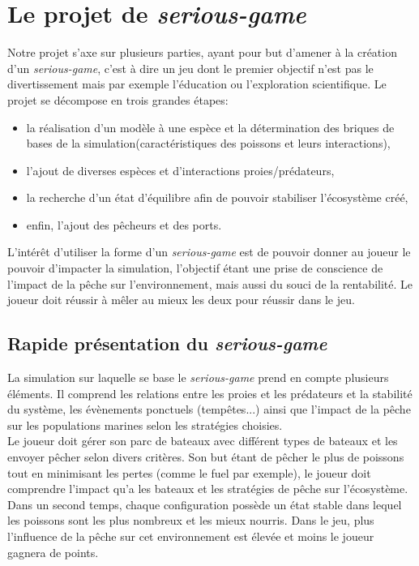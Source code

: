 \chapter{Le projet de \textit{serious-game}}
Notre projet s'axe sur plusieurs parties, ayant pour but d'amener à la création d'un \textit{serious-game}, c'est à dire un jeu dont le premier objectif n'est pas le divertissement mais par exemple l'éducation ou l'exploration scientifique. Le projet se décompose en trois grandes étapes:
\begin{itemize}
\item{la réalisation d'un modèle à une espèce et la détermination des briques de bases de la simulation(caractéristiques des poissons et leurs interactions),}
\item{l'ajout de diverses espèces et d'interactions proies/prédateurs,}
\item{la recherche d'un état d'équilibre afin de pouvoir stabiliser l'écosystème créé,}
\item{enfin, l'ajout des pêcheurs et des ports.}
\end{itemize}

L'intérêt d'utiliser la forme d'un \textit{serious-game} est de pouvoir donner au joueur le pouvoir d'impacter la simulation, l'objectif étant une prise de conscience de l'impact de la pêche sur l'environnement, mais aussi du souci de la rentabilité. Le joueur doit réussir à mêler au mieux les deux pour réussir dans le jeu.

\section{Rapide présentation du \textit{serious-game}}

La simulation sur laquelle se base le \textit{serious-game} prend en compte plusieurs éléments. Il comprend les relations entre les proies et les prédateurs et la stabilité du système, les évènements ponctuels (tempêtes...) ainsi que l'impact de la pêche sur les populations marines selon les stratégies choisies.
\\
Le joueur doit gérer son parc de bateaux avec différent types de bateaux et les envoyer pêcher selon divers critères. Son but étant de pêcher le plus de poissons tout en minimisant les pertes (comme le fuel par exemple), le joueur doit comprendre l'impact qu'a les bateaux et les stratégies de pêche sur l'écosystème.
\\
Dans un second temps, chaque configuration possède un état stable dans lequel les poissons sont les plus nombreux et les mieux nourris. Dans le jeu, plus l'influence de la pêche sur cet environnement est élevée et moins le joueur gagnera de points.

